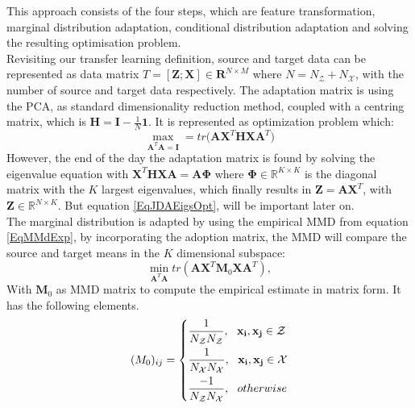 This approach consists of the four steps, which are feature transformation, marginal distribution adaptation, conditional distribution adaptation and solving the resulting optimisation problem.\cite{Long.}\\
Revisiting our transfer learning definition, source and target data can be represented as data matrix $T = [\mathbf{Z};\mathbf{X}] \in \mathbf{R}^{N\times M}$ where $N = N_\mathcal{Z}+N_\mathcal{X}$, with the number of source and target data respectively.
The adaptation matrix is using the \acs{PCA}, as standard dimensionality reduction method, coupled with a centring matrix, which is $\mathbf{H}=\mathbf{I}-\frac{1}{N}\mathbf{1}$.
It is represented as optimization problem which:\cite{Long.}
\begin{equation}\label{EqJDAEigsOpt}
\max_{\mathbf{A}^T\mathbf{A}=\mathbf{I}} = tr\big(\mathbf{A}\mathbf{X}^T\mathbf{HX}\mathbf{A}^T\big)
\end{equation}
However, the end of the day the adaptation matrix is found by solving the eigenvalue equation with $\mathbf{X}^T\mathbf{HXA} = \mathbf{A}\mathbf{\Phi}$ where $\mathbf{\Phi} \in \mathbb{R}^{K\times K}$ is the diagonal matrix with the $K$ largest eigenvalues, which finally results in $\mathbf{Z} = \mathbf{A}\mathbf{X}^T$, with $\mathbf{Z} \in \mathbb{R}^{N\times K}$.
But equation \eqref{EqJDAEigsOpt}, will be important later on.\cite{Long.}\\
The marginal distribution is adapted by using the empirical \acs{MMD} from equation \eqref{EqMMdExp}, by incorporating the adoption matrix, the \acs{MMD} will compare the source and target means in the $K$ dimensional subspace:\cite{Long.}
\begin{equation}\label{EqJDAMarginalOpt}
\min_{\mathbf{A}^T\mathbf{A}} tr(\mathbf{A}\mathbf{X}^T\mathbf{M}_0\mathbf{X}\mathbf{A}^T),
\end{equation}
With $\mathbf{M}_0$ as \acs{MMD} matrix to compute the empirical estimate in matrix form.
It has the following elements.
\begin{equation}\label{EqJDAMarginalMMD}
(M_0)_{ij}= \begin{dcases}
\frac{1}{N_\mathcal{Z}N_\mathcal{Z}},\>\>\> \mathbf{x_i},\mathbf{x_j} \in \mathcal{Z}\\
\frac{1}{N_\mathcal{X}N_\mathcal{X}},\>\>\> \mathbf{x_i},\mathbf{x_j} \in \mathcal{X}\\
\frac{-1}{N_\mathcal{Z}N_\mathcal{X}},\>\>\> otherwise
\end{dcases}
\end{equation}
